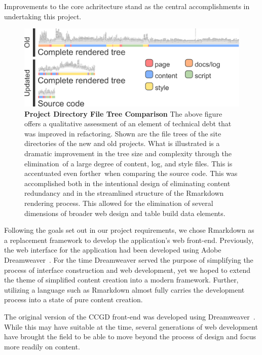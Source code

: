 \documentclass[10pt]{report}
\begin{document}
Improvements to the core achritecture stand as the central accomplishments in undertaking this project.

\begin{figure}[H]
    \centering
    \includegraphics[width=\textwidth]{fig/file_tree.png}
    \caption[Project Directory File Tree Comparison]{\textbf{Project Directory File Tree Comparison} The above figure offers a qualitative assessment of an element of technical debt that was improved in refactoring. Shown are the file trees of the site directories of the new and old projects. What is illustrated is a dramatic improvement in the tree size and complexity through the elimination of a large degree of content, log, and style files. This is accentuated even forther when comparing the source code. This was accomplished both in the intentional design of eliminating content redundancy and in the streamlined structure of the Rmarkdown rendering process. This allowed for the elimination of several dimensions of broader web design and table build data elements.}\label{fig:fileTree}
\end{figure}

Following the goals set out in our project requirements, we chose Rmarkdown as a replacement framework to develop the application's web front-end. Previously, the web interface for the application had been developed using Adobe Dreamweaver~\cite{Abbott2015}. For the time Dreamweaver served the purpose of simplifying the process of interface construction and web development, yet we hoped to extend the theme of simplified content creation into a modern framework. Further, utilizing a language such as Rmarkdown almost fully carries the development process into a state of pure content creation.

The original version of the CCGD front-end was developed using Dreamweaver~\cite{Abbott2015}. While this may have suitable at the time, several generations of web development have brought the field to be able to move beyond the process of design and focus more readily on content.
\end{document}

